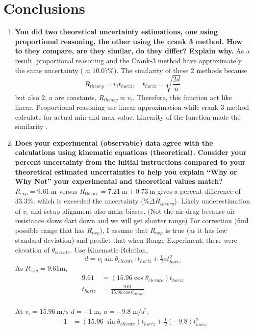 \documentclass[12pt]{article}
\begin{document}
\section{Conclusions}
\begin{enumerate}[label=(\alph*), leftmargin=1.2cm]
  \item \textbf{You did two theoretical uncertainty estimations, one using proportional reasoning, the other using the crank 3 method. How to they compare, are they similar, do they differ? Explain why.} As a result, proportional reasoning and the Crank-3 method have approximately the same uncertainty ($\approx 10.07\%$). The similarity of these 2 methods because 
  \[
  R_{theory}=v_it_{horiz}, \quad t_{horiz}=\sqrt{\frac{2d}{a}}
  \]
  but also $2$, $a$ are constants,  $R_{theory} \propto v_i$. Therefore, this function act like linear. Proportional reasoning use linear approximation while crank 3 method calculate for actual min and max value. Linearity of the function made the similarity \cite{Taylor1997}.
  
  \item \textbf{Does your experimental (observable) data agree with the calculations using kinematic equations (theoretical). Consider your percent uncertainty from the initial instructions compared to your theoretical estimated uncertainties to help you explain “Why or Why Not” your experimental and theoretical values match?} $R_{\exp}=9.61~\mathrm{m}$ versus $R_{\mathrm{theory}}=7.21~\mathrm{m}\pm0.73~\mathrm{m}$ gives a percent difference of $33.3\%$, which is exceeded the uncertainty ($\%\Delta R_{theory}$). Likely underestimation of $v_i$ and setup alignment also make biases. (Not the air drag because air resistance slows dart down and we will get shorter range)
  For correction (find possible range that has $R_{exp}$), I assume that $R_{exp}$ is true (as it has low standard deviation) and predict that when Range Experiment, there were elevation of $\theta_{elevate}$.
    Use Kinematic Relation,
    \[
    d = v_i \sin \theta_{elevate} \cdot t_{horiz}+\tfrac12 at_{horiz}^2
    \]
    As $R_{exp}=9.61\mathrm{m}$,
    \[
    \begin{aligned}
    9.61 &= (15.96 \cos \theta_{elevate} )t_{horiz} \\
    t_{horiz} &= \frac{9.61}{15.96\cos\theta_{elevate}} \\
    \end{aligned}
    \]
    \vspace{1em}
    
    At $v_i=15.96~\mathrm{m/s}$ 
    $d=-1~\mathrm{m}$, $a=-9.8~\mathrm{m/s^2}$,
    \[
    \begin{aligned}
    -1 &= (15.96~\sin\theta_{elevate})t_{horiz} +\tfrac12(-9.8)t_{horiz}^2 \\
    \end{aligned}
    \]


\end{enumerate}
\end{document}
